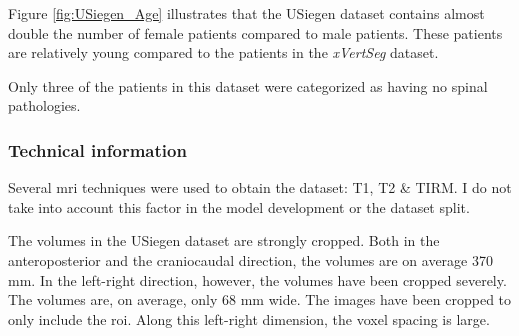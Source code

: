 Figure \ref{fig:USiegen_Age} illustrates that the USiegen dataset contains almost double the number of female patients compared to male patients.
These patients are relatively young compared to the patients in the \textit{xVertSeg} dataset.

Only three of the patients in this dataset were categorized as having no spinal pathologies.

\subsubsection{Technical information}

Several \acrlong{mri} techniques were used to obtain the dataset: T1, T2 \& TIRM.
I do not take into account this factor in the model development or the dataset split.

The volumes in the USiegen dataset are strongly cropped. 
Both in the anteroposterior and the craniocaudal direction, the volumes are on average 370 mm.
In the left-right direction, however, the volumes have been cropped severely. The volumes are, on average, only 68 mm wide.
The images have been cropped to only include the \acrshort{roi}.
Along this left-right dimension, the voxel spacing is large. 

